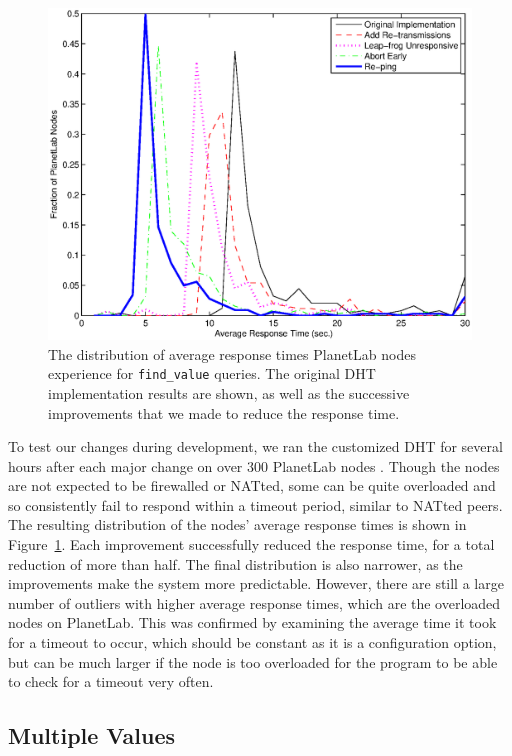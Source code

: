 \documentclass[conference]{IEEEtran}
\begin{document}
\begin{figure}
\centering
\includegraphics[width=\columnwidth]{apt_p2p_improvements-find_value.eps}
\caption{The distribution of average response times PlanetLab nodes
experience for \texttt{find\_value} queries. The original DHT
implementation results are shown, as well as the successive
improvements that we made to reduce the response time.}
\label{improvements}
\end{figure}

To test our changes during development, we ran the customized DHT
for several hours after each major change on over 300 PlanetLab nodes
\cite{planetlab}. Though the nodes are not expected to be firewalled
or NATted, some can be quite overloaded and so consistently fail to
respond within a timeout period, similar to NATted peers. The
resulting distribution of the nodes' average response times is shown
in Figure~\ref{improvements}. Each improvement successfully reduced
the response time, for a total reduction of more than half. The
final distribution is also narrower, as the improvements make the
system more predictable. However, there are still a large number of
outliers with higher average response times, which are the
overloaded nodes on PlanetLab. This was confirmed by examining the
average time it took for a timeout to occur, which should be
constant as it is a configuration option, but can be much larger if
the node is too overloaded for the program to be able to check for a
timeout very often.

\subsection{Multiple Values}
\label{multiple_values}
\end{document}
